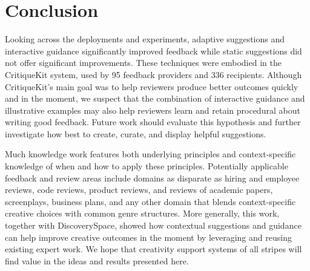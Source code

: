 \section{Conclusion}
Looking across the deployments and experiments, adaptive suggestions and interactive guidance significantly improved feedback while static suggestions did not offer significant improvements. These techniques were embodied in the CritiqueKit system, used by 95 feedback providers and 336 recipients. Although CritiqueKit's main goal was to help reviewers produce better outcomes quickly and in the moment, we suspect that the combination of interactive guidance and illustrative examples may also help reviewers learn and retain procedural about writing good feedback. Future work should evaluate this hypothesis and further investigate how best to create, curate, and display helpful suggestions. 

Much knowledge work features both underlying principles and context-specific knowledge of when and how to apply these principles. Potentially applicable feedback and review areas include domains as disparate as hiring and employee reviews, code reviews, product reviews, and reviews of academic papers, screenplays, business plans, and any other domain that blends context-specific creative choices with common genre structures. More generally, this work, together with Discovery\-Space, showed how contextual suggestions and guidance can help improve creative outcomes in the moment by leveraging and reusing existing expert work. We hope that creativity support systems of all stripes will find value in the ideas and results presented here.